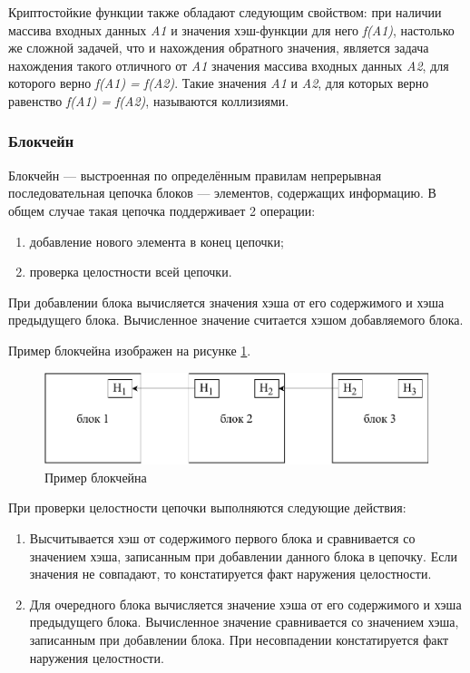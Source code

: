 Криптостойкие функции также обладают следующим свойством: при наличии массива входных данных \textit{A1} и значения хэш-функции для него \textit{f(A1)}, настолько же сложной задачей, что и нахождения обратного значения, является задача нахождения такого отличного от \textit{A1} значения массива входных данных \textit{A2}, для которого верно \textit{f(A1) = f(A2)}. Такие значения \textit{A1} и \textit{A2}, для которых верно равенство \textit{f(A1) = f(A2)}, называются коллизиями.

\subsubsection{Блокчейн}

Блокчейн\cite{bitcoin} --- выстроенная по определённым правилам непрерывная последовательная цепочка блоков --- элементов, содержащих информацию. В общем случае такая цепочка поддерживает 2 операции:
\begin{enumerate}
    \item добавление нового элемента в конец цепочки;
    \item проверка целостности всей цепочки.
\end{enumerate}

При добавлении блока вычисляется значения хэша от его содержимого и хэша предыдущего блока. Вычисленное значение считается хэшом добавляемого блока.

Пример блокчейна изображен на рисунке \ref{fig:blockchain}.

\begin{figure}[hbtp]
    \centering
    \includegraphics[width=\textwidth]{img/blockchain.pdf}
    \caption{Пример блокчейна}
    \label{fig:blockchain}
\end{figure}

При проверки целостности цепочки выполняются следующие действия:
\begin{enumerate}
    \item Высчитывается хэш от содержимого первого блока и сравнивается со значением хэша, записанным при добавлении данного блока в цепочку. Если значения не совпадают, то констатируется факт наружения целостности.
    \item Для очередного блока вычисляется значение хэша от его содержимого и хэша предыдущего блока. Вычисленное значение сравнивается со значением хэша, записанным при добавлении блока. При несовпадении констатируется факт наружения целостности.
\end{enumerate}

